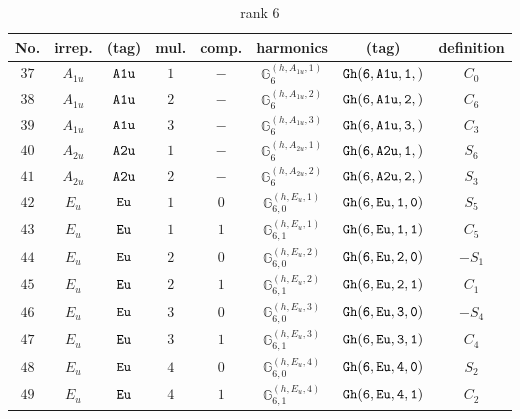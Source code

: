 \documentclass[fleqn,8pt]{jsarticle}
\begin{document}
\begin{table}[ht!]
\begin{center}
\caption{rank 6}
\renewcommand{\arraystretch}{1.3}
\begin{tabular}{cccccccc} \hline \hline
No. & irrep. & (tag) & mul. & comp. & harmonics & (tag) & definition \\ \hline
$ 37 $ & $ A_{1u} $ & $ {\tt A1u} $ & $ 1 $ & $ - $ & $ \mathbb{G}_{6}^{(h,A_{1u},1)} $ & $ {\tt Gh(6,A1u,1,)} $ & $ C_{0} $ \\
$ 38 $ & $ A_{1u} $ & $ {\tt A1u} $ & $ 2 $ & $ - $ & $ \mathbb{G}_{6}^{(h,A_{1u},2)} $ & $ {\tt Gh(6,A1u,2,)} $ & $ C_{6} $ \\
$ 39 $ & $ A_{1u} $ & $ {\tt A1u} $ & $ 3 $ & $ - $ & $ \mathbb{G}_{6}^{(h,A_{1u},3)} $ & $ {\tt Gh(6,A1u,3,)} $ & $ C_{3} $ \\
$ 40 $ & $ A_{2u} $ & $ {\tt A2u} $ & $ 1 $ & $ - $ & $ \mathbb{G}_{6}^{(h,A_{2u},1)} $ & $ {\tt Gh(6,A2u,1,)} $ & $ S_{6} $ \\
$ 41 $ & $ A_{2u} $ & $ {\tt A2u} $ & $ 2 $ & $ - $ & $ \mathbb{G}_{6}^{(h,A_{2u},2)} $ & $ {\tt Gh(6,A2u,2,)} $ & $ S_{3} $ \\
$ 42 $ & $ E_{u} $ & $ {\tt Eu} $ & $ 1 $ & $ 0 $ & $ \mathbb{G}_{6,0}^{(h,E_{u},1)} $ & $ {\tt Gh(6,Eu,1,0)} $ & $ S_{5} $ \\
$ 43 $ & $ E_{u} $ & $ {\tt Eu} $ & $ 1 $ & $ 1 $ & $ \mathbb{G}_{6,1}^{(h,E_{u},1)} $ & $ {\tt Gh(6,Eu,1,1)} $ & $ C_{5} $ \\
$ 44 $ & $ E_{u} $ & $ {\tt Eu} $ & $ 2 $ & $ 0 $ & $ \mathbb{G}_{6,0}^{(h,E_{u},2)} $ & $ {\tt Gh(6,Eu,2,0)} $ & $ - S_{1} $ \\
$ 45 $ & $ E_{u} $ & $ {\tt Eu} $ & $ 2 $ & $ 1 $ & $ \mathbb{G}_{6,1}^{(h,E_{u},2)} $ & $ {\tt Gh(6,Eu,2,1)} $ & $ C_{1} $ \\
$ 46 $ & $ E_{u} $ & $ {\tt Eu} $ & $ 3 $ & $ 0 $ & $ \mathbb{G}_{6,0}^{(h,E_{u},3)} $ & $ {\tt Gh(6,Eu,3,0)} $ & $ - S_{4} $ \\
$ 47 $ & $ E_{u} $ & $ {\tt Eu} $ & $ 3 $ & $ 1 $ & $ \mathbb{G}_{6,1}^{(h,E_{u},3)} $ & $ {\tt Gh(6,Eu,3,1)} $ & $ C_{4} $ \\
$ 48 $ & $ E_{u} $ & $ {\tt Eu} $ & $ 4 $ & $ 0 $ & $ \mathbb{G}_{6,0}^{(h,E_{u},4)} $ & $ {\tt Gh(6,Eu,4,0)} $ & $ S_{2} $ \\
$ 49 $ & $ E_{u} $ & $ {\tt Eu} $ & $ 4 $ & $ 1 $ & $ \mathbb{G}_{6,1}^{(h,E_{u},4)} $ & $ {\tt Gh(6,Eu,4,1)} $ & $ C_{2} $ \\
 \hline \hline
\end{tabular}
\end{center}
\end{table}
\end{document}
